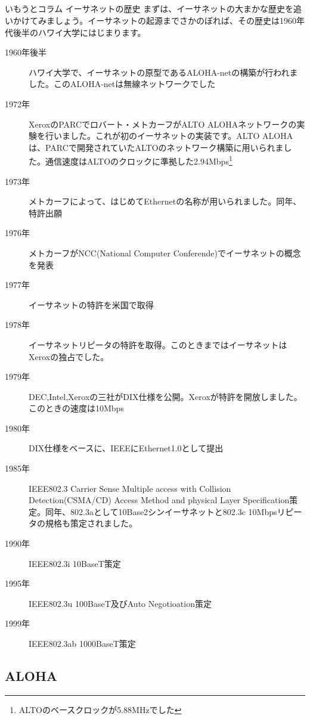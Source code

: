 \subsection*{}
\begin{itembox}[l]{いもうとコラム イーサネットの歴史}
まずは、イーサネットの大まかな歴史を追いかけてみましょう。イーサネットの起源までさかのぼれば、その歴史は1960年代後半のハワイ大学にはじまります。

\begin{description}
\item[1960年後半]ハワイ大学で、イーサネットの原型であるALOHA-netの構築が行われました。このALOHA-netは無線ネットワークでした
\item[1972年]XeroxのPARCでロバート・メトカーフがALTO ALOHAネットワークの実験を行いました。これが初のイーサネットの実装です。ALTO ALOHAは、PARCで開発されていたALTOのネットワーク構築に用いられました。通信速度はALTOのクロックに準拠した2.94Mbps\footnote{ALTOのベースクロックが5.88MHzでした}
\item[1973年]メトカーフによって、はじめてEthernetの名称が用いられました。同年、特許出願
\item[1976年]メトカーフがNCC(National Computer Conferende)でイーサネットの概念を発表
\item[1977年]イーサネットの特許を米国で取得
\item[1978年]イーサネットリピータの特許を取得。このときまではイーサネットはXeroxの独占でした。
\item[1979年]DEC,Intel,Xeroxの三社がDIX仕様を公開。Xeroxが特許を開放しました。このときの速度は10Mbps
\item[1980年]DIX仕様をベースに、IEEEにEthernet1.0として提出
\item[1985年]IEEE802.3 Carrier Sense Multiple access with Collision Detection(CSMA/CD) Access Method and physical Layer Specification策定。同年、802.3aとして10Base2シンイーサネットと802.3c 10Mbpsリピータの規格も策定されました。
\item[1990年]IEEE802.3i 10BaseT策定
\item[1995年]IEEE802.3u 100BaseT及びAuto Negotioation策定
\item[1999年]IEEE802.3ab 1000BaseT策定
\end{description}

\end{itembox}


\subsection{ALOHA}

